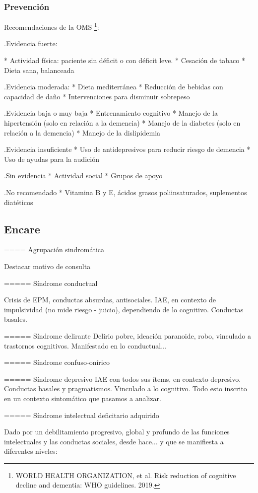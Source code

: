 \documentclass[encares.tex]{subfiles}
\begin{document}
\subsubsection*{Prevención}
Recomendaciones de la OMS \footnote{WORLD HEALTH ORGANIZATION, et al. Risk reduction of cognitive decline and dementia: WHO guidelines. 2019.}:

.Evidencia fuerte:

* Actividad física: paciente sin déficit o con déficit leve.
* Cesación de tabaco
* Dieta sana, balanceada

.Evidencia moderada:
* Dieta mediterránea
* Reducción de bebidas con capacidad de daño
* Intervenciones para disminuir sobrepeso

.Evidencia baja o muy baja
* Entrenamiento cognitivo
* Manejo de la hipertensión (solo en relación a la demencia)
* Manejo de la diabetes (solo en relación a la demencia)
* Manejo de la dislipidemia

.Evidencia insuficiente
* Uso de antidepresivos para reducir riesgo de demencia
* Uso de ayudas para la audición

.Sin evidencia
* Actividad social
* Grupos de apoyo

.No recomendado
* Vitamina B y E, ácidos grasos poliinsaturados, suplementos diatéticos

\subsection*{Encare}

==== Agrupación sindromática

Destacar motivo de consulta

===== Síndrome conductual

Crisis de EPM, conductas absurdas, antisociales. IAE, en contexto de impulsividad (no mide riesgo - juicio), dependiendo de lo cognitivo. Conductas basales.

=====  Síndrome delirante
Delirio pobre, ideación paranoide, robo, vinculado a trastornos cognitivos. Manifestado en lo conductual...

===== Síndrome confuso-onírico

===== Síndrome depresivo
IAE con todos sus ítems, en contexto depresivo. Conductas basales y pragmatismos. Vinculado a lo cognitivo. Todo esto inscrito en un contexto sintomático que pasamos a analizar.

===== Síndrome intelectual deficitario adquirido

Dado por un debilitamiento progresivo, global y profundo de las funciones intelectuales y las conductas sociales, desde hace... y que se manifiesta a diferentes niveles:
\end{document}
